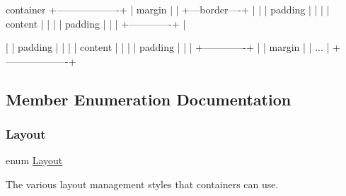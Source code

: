 \begin{DoxyPre}
 container
+-------------------+
|      margin       |
|  +---border----+  |
|  |   padding   |  |
|  |   content   |  |
|  |   padding   |  |
|  +-------------+  |
\tabulinesep=1mm

|  |   padding   |  |
|  |   content   |  |
|  |   padding   |  |
|  +-------------+  |
|      margin       |
|       ...         |
+-------------------+
\end{DoxyPre}
 

\subsection{Member Enumeration Documentation}
\mbox{\label{classsgl_1_1GContainer_a1b7da28ed84c0763e8f92cde2df4799b}} 
\subsubsection{\texorpdfstring{Layout}{Layout}}
{\footnotesize\ttfamily enum \mbox{\hyperlink{classsgl_1_1GContainer_a1b7da28ed84c0763e8f92cde2df4799b}{Layout}}}



The various layout management styles that containers can use. 


